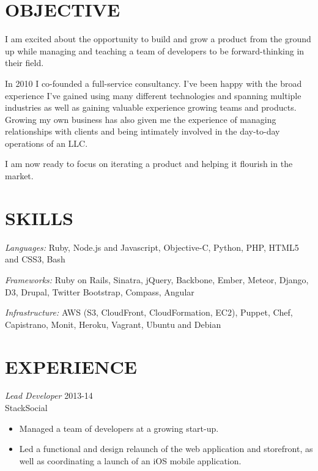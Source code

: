 \documentclass[line,margin]{res}
\begin{document}
\address{q.shanahan@gmail.com}
\address{(641) 233-1123}

\begin{resume}

\section{OBJECTIVE}

    I am excited about the opportunity to build and grow a product from the
    ground up while managing and teaching a team of developers to be
    forward-thinking in their field.

    In 2010 I co-founded a full-service consultancy. I've been happy with the
    broad experience I've gained using many different technologies and
    spanning multiple industries as well as gaining valuable experience
    growing teams and products. Growing my own business has also given me the
    experience of managing relationships with clients and being intimately
    involved in the day-to-day operations of an LLC.

    I am now ready to focus on iterating a product and helping it flourish in
    the market.

\section{SKILLS}
    {\sl Languages:}
        Ruby, Node.js and Javascript,
        Objective-C, Python, PHP, HTML5 and CSS3, Bash

    {\sl Frameworks:}
        Ruby on Rails, Sinatra, jQuery, Backbone, Ember, Meteor,
        Django, D3, Drupal, Twitter Bootstrap, Compass, Angular

    {\sl Infrastructure:}
        AWS (S3, CloudFront, CloudFormation, EC2), Puppet,
        Chef, Capistrano, Monit, Heroku, Vagrant, Ubuntu and Debian

\section{EXPERIENCE}
    {\sl Lead Developer}
    \hfill 2013-14 \\
    StackSocial
    \begin{itemize} \itemsep -2pt
        \item
            Managed a team of developers at a growing start-up.

        \item
            Led a functional and design relaunch of the web
            application and storefront, as well as coordinating
            a launch of an iOS mobile application.
    \end{itemize}


\end{resume}
\end{document}
